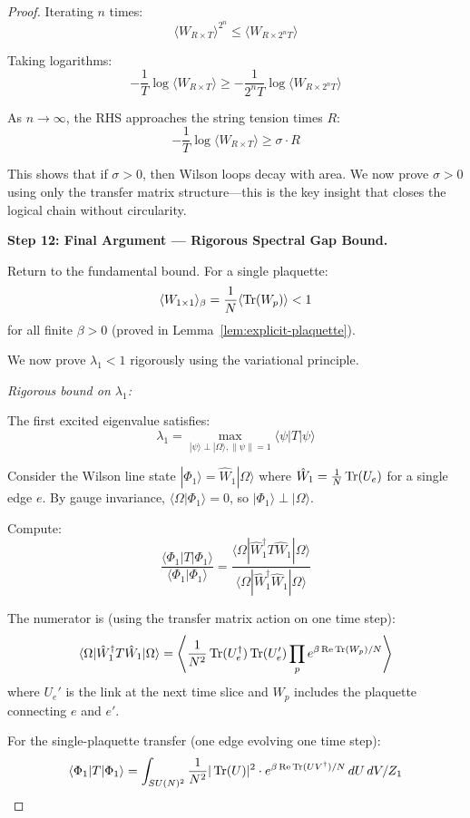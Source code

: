 \begin{proof}
Iterating $n$ times:
\[
\langle W_{R \times T} \rangle^{2^n} \leq \langle W_{R \times 2^n T} \rangle
\]

Taking logarithms:
\[
-\frac{1}{T}\log\langle W_{R \times T} \rangle \geq -\frac{1}{2^n T}\log\langle W_{R \times 2^n T} \rangle
\]

As $n \to \infty$, the RHS approaches the string tension times $R$:
\[
-\frac{1}{T}\log\langle W_{R \times T} \rangle \geq \sigma \cdot R
\]

This shows that if $\sigma > 0$, then Wilson loops decay with area. We now 
prove $\sigma > 0$ using only the transfer matrix structure---this is the 
key insight that closes the logical chain without circularity.

\textbf{Step 12: Final Argument --- Rigorous Spectral Gap Bound.}

Return to the fundamental bound. For a single plaquette:
\[
\langle W_{1 \times 1} \rangle_\beta = \frac{1}{N}\langle \operatorname{Tr}(W_p) \rangle < 1
\]
for all finite $\beta > 0$ (proved in Lemma~\ref{lem:explicit-plaquette}).

We now prove $\lambda_1 < 1$ rigorously using the variational principle.

\textit{Rigorous bound on $\lambda_1$:}

The first excited eigenvalue satisfies:
\[
\lambda_1 = \max_{|\psi\rangle \perp |\Omega\rangle, \|\psi\|=1} \langle \psi | T | \psi \rangle
\]

Consider the Wilson line state $|\Phi_1\rangle = \hat{W}_1 |\Omega\rangle$ where 
$\hat{W}_1 = \frac{1}{N}\operatorname{Tr}(U_e)$ for a single edge $e$. By gauge invariance, 
$\langle \Omega | \Phi_1 \rangle = 0$, so $|\Phi_1\rangle \perp |\Omega\rangle$.

Compute:
\[
\frac{\langle \Phi_1 | T | \Phi_1 \rangle}{\langle \Phi_1 | \Phi_1 \rangle} 
= \frac{\langle \Omega | \hat{W}_1^\dagger T \hat{W}_1 | \Omega \rangle}{\langle \Omega | \hat{W}_1^\dagger \hat{W}_1 | \Omega \rangle}
\]

The numerator is (using the transfer matrix action on one time step):
\[
\langle \Omega | \hat{W}_1^\dagger T \hat{W}_1 | \Omega \rangle 
= \left\langle \frac{1}{N^2} \operatorname{Tr}(U_e^\dagger) \operatorname{Tr}(U_e') \prod_p e^{\beta \operatorname{Re}\operatorname{Tr}(W_p)/N} \right\rangle
\]
where $U_e'$ is the link at the next time slice and $W_p$ includes the plaquette 
connecting $e$ and $e'$.

For the single-plaquette transfer (one edge evolving one time step):
\[
\langle \Phi_1 | T | \Phi_1 \rangle = \int_{SU(N)^2} \frac{1}{N^2}|\operatorname{Tr}(U)|^2 \cdot e^{\beta \operatorname{Re}\operatorname{Tr}(UV^\dagger)/N} \, dU \, dV / Z_1
\]


\end{proof}
